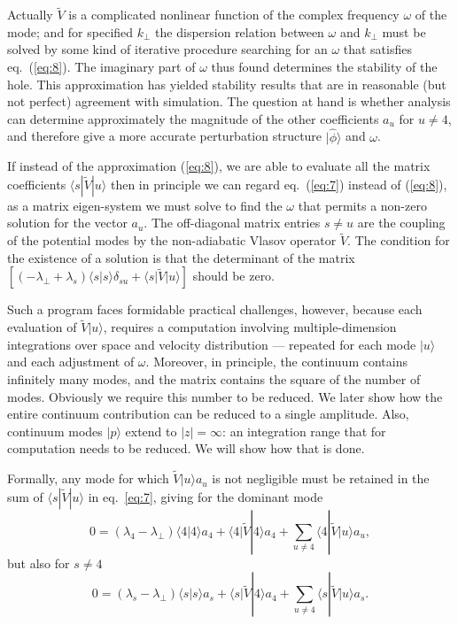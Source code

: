 \documentclass[12pt]{article}
\def\ket#1{|#1\rangle}
\def\bra#1{\langle#1}
\begin{document}
Actually $\tilde{V}$ is a complicated nonlinear function of the
complex frequency $\omega$ of the mode; and for specified $k_\perp$
the dispersion relation between $\omega$ and $k_\perp$ must be solved
by some kind of iterative procedure searching for an $\omega$ that
satisfies eq.\ (\ref{eq:8}). The imaginary part of $\omega$ thus found
determines the stability of the hole. This approximation has yielded
stability results\cite{Hutchinson2018a,Hutchinson2019,Hutchinson2019a} that are in reasonable (but not perfect) agreement
with simulation.  The question at hand is whether analysis can
determine approximately the magnitude of the other coefficients $a_u$
for $u\not=4$, and therefore give a more accurate perturbation
structure $\ket{\hat\phi}$ and $\omega$.

If instead of the approximation (\ref{eq:8}), we are able to evaluate all the
matrix coefficients $\bra{s}|\tilde{V}\ket{u}$ then in principle we can regard eq.\
(\ref{eq:7}) instead of (\ref{eq:8}), as a matrix eigen-system we must
solve to find the $\omega$ that permits a non-zero solution for the
vector $a_u$. The off-diagonal matrix entries $s\not=u$ are the
coupling of the potential modes by the non-adiabatic Vlasov operator
$\tilde{V}$.  The condition for the existence of a solution is that the
determinant of the matrix
$[(-\lambda_\perp+\lambda_s)\bra{s}\ket{s}\delta_{su}+\bra{s}|\tilde{V}\ket{u}]$ should
be zero.

Such a program faces formidable practical challenges, however, because
each evaluation of $\tilde{V}\ket{u}$, requires a computation
involving multiple-dimension integrations over space and velocity
distribution --- repeated for each mode $\ket{u}$ and each adjustment
of $\omega$.  Moreover, in principle, the continuum contains
infinitely many modes, and the matrix contains the square of the
number of modes.  Obviously we require this number to be reduced. We
later show how the entire continuum contribution can be reduced to a
single amplitude. Also, continuum modes $\ket{p}$ extend to
$|z|=\infty$: an integration range that for computation needs to be
reduced. We will show how that is done.

Formally, any mode for which $\tilde{V}\ket{u}a_u$ is not negligible
must be retained in the sum of $\bra{s}|\tilde{V}\ket{u}$ in eq.\
\ref{eq:7}, giving for the dominant mode
\begin{equation}
  \label{eq:9}
  0=(\lambda_4-\lambda_\perp)\bra{4}\ket{4}a_4+\bra{4}|\tilde{V}\ket{4}a_4+\sum_{u\not=4}\bra{4}|\tilde{V}\ket{u}a_u,
\end{equation}
but also for $s\not=4$
\begin{equation}
  \label{eq:10}
 0=(\lambda_s-\lambda_\perp)\bra{s}\ket{s}a_s+\bra{s}|\tilde{V}\ket{4}a_4+\sum_{u\not=4}\bra{s}|\tilde{V}\ket{u}a_s.
\end{equation}
\end{document}
